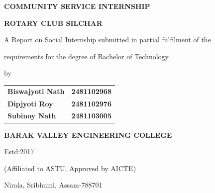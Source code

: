 \documentclass[12pt,a4paper]{report}
\begin{document}
\begin{titlepage}
    \centering
    
    \vspace*{1cm}
    
    {\Large \textbf{COMMUNITY SERVICE INTERNSHIP}\par}
    {\Large \textbf{ROTARY CLUB SILCHAR}\par}
    
    \vspace{2cm}
    
    {\large A Report on Social Internship submitted in partial fulfilment of the\par}
    {\large requirements for the degree of Bachelor of Technology\par}
    \vspace{0.5cm}
    {\large by\par}
    
    \vspace{1.5cm}
    
    \begin{table}[h]
        \centering
        \large
        \renewcommand{\arraystretch}{1.5}
        \begin{tabular}{lc}
            \textbf{Biswajyoti Nath} & \hspace{2cm} \textbf{2481102968} \\
            \textbf{Dipjyoti Roy} & \hspace{2cm} \textbf{2481102976} \\
            \textbf{Subinoy Nath} & \hspace{2cm} \textbf{2481103005} \\
        \end{tabular}
    \end{table}
    
    \vfill
    
    
    {\LARGE \textbf{BARAK VALLEY ENGINEERING COLLEGE}\par}
    {\large Estd:2017\par}
    {\large (Affiliated to ASTU, Approved by AICTE)\par}
    \vspace{0.5cm}
    {\large Nirala, Sribhumi, Assam-788701\par}
    
\end{titlepage}
\end{document}
